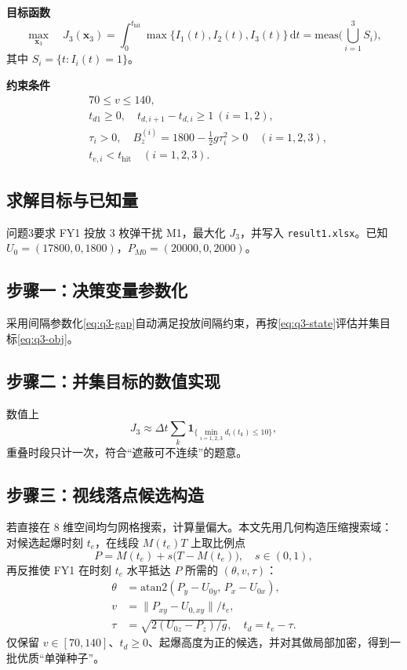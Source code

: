 \documentclass[withoutpreface,bwprint]{cumcmthesis}
\begin{document}
\textbf{目标函数}
\begin{equation}
\max_{\mathbf{x}_3}\quad
J_3(\mathbf{x}_3)
=\int_{0}^{t_{\mathrm{hit}}}
\max\big\{I_1(t),I_2(t),I_3(t)\big\}\,\mathrm{d}t
=\mathrm{meas}\Big(\bigcup_{i=1}^{3}S_i\Big),
\label{eq:q3-obj}
\end{equation}
其中 $S_i=\{t:I_i(t)=1\}$。

\textbf{约束条件}
\begin{equation}
\begin{aligned}
&70\le v\le 140,\\
&t_{d1}\ge 0,\quad
t_{d,i+1}-t_{d,i}\ge 1\ (i=1,2),\\
&\tau_i>0,\quad
B^{(i)}_z=1800-\tfrac12 g\tau_i^2>0\quad(i=1,2,3),\\
&t_{e,i}<t_{\mathrm{hit}}\quad(i=1,2,3).
\end{aligned}
\label{eq:q3-con}
\end{equation}

\subsection{求解目标与已知量}
问题3要求 FY1 投放 3 枚弹干扰 M1，最大化 $J_3$，并写入 \texttt{result1.xlsx}。已知 $U_0=(17800,0,1800)$，$P_{M0}=(20000,0,2000)$。

\subsection{步骤一：决策变量参数化}
采用间隔参数化\eqref{eq:q3-gap}自动满足投放间隔约束，再按\eqref{eq:q3-state}评估并集目标\eqref{eq:q3-obj}。

\subsection{步骤二：并集目标的数值实现}
数值上
\begin{equation}
J_3\approx\Delta t\sum_k\mathbf{1}_{\{\min_{i=1,2,3}d_i(t_k)\le 10\}},
\label{eq:J3}
\end{equation}
重叠时段只计一次，符合“遮蔽可不连续”的题意。

\subsection{步骤三：视线落点候选构造}
若直接在 8 维空间均匀网格搜索，计算量偏大。本文先用几何构造压缩搜索域：对候选起爆时刻 $t_e$，在线段 $M(t_e)T$ 上取比例点
\[
P=M(t_e)+s\big(T-M(t_e)\big),\quad s\in(0,1),
\]
再反推使 FY1 在时刻 $t_e$ 水平抵达 $P$ 所需的 $(\theta,v,\tau)$：
\begin{align}
\theta&=\mathrm{atan2}(P_y-U_{0y},\,P_x-U_{0x}),\\
v&=\|P_{xy}-U_{0,xy}\|/t_e,\\
\tau&=\sqrt{2(U_{0z}-P_z)/g},\quad t_d=t_e-\tau.
\end{align}
仅保留 $v\in[70,140]$、$t_d\ge 0$、起爆高度为正的候选，并对其做局部加密，得到一批优质“单弹种子”。
\end{document}

